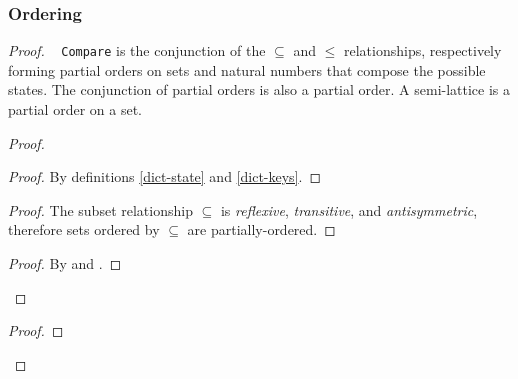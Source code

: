 \documentclass[9pt, oneside]{article}   	%
\begin{document}
\subsubsection{Ordering}
\label{sec:longer-proofs:ordering}

\begin{proof}
		\pfsketch~ \texttt{Compare} is the conjunction of the $\subseteq$ and $\leq$ relationships, respectively forming partial orders on sets and natural numbers that compose the possible states. The conjunction of partial orders is also a partial order. A semi-lattice is a partial order on a set.

		\begin{proof}
		
			\begin{proof}
				By definitions \ref{dict-state} and \ref{dict-keys}.
			\end{proof}
			
			\begin{proof}
				The subset relationship $\subseteq$ is \textit{reflexive}, \textit{transitive}, and \textit{antisymmetric},  therefore sets ordered by $\subseteq$ are partially-ordered.
			\end{proof}
			
			\qedstep
			 \begin{proof}
			  	By  and .
			\end{proof}
		\end{proof}
		
		\begin{proof}
		

\end{proof}
\end{proof}
\end{document}
